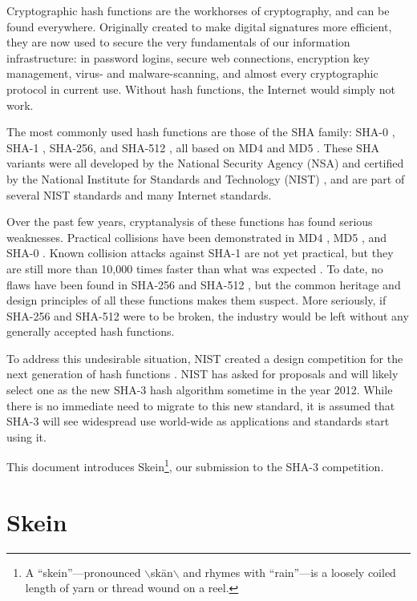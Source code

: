 \documentclass[11pt,twoside]{article}
\begin{document}
Cryptographic hash functions are the workhorses of cryptography, and can be found everywhere. Originally created to make digital signatures more efficient, they are now used to secure the very fundamentals of our information infrastructure: in password logins, secure web connections, encryption key management, virus- and malware-scanning, and almost every cryptographic protocol in current use.  Without hash functions, the Internet would simply not work.

The most commonly used hash functions are those of the SHA family: SHA-0 \cite{SHA}, SHA-1 \cite{SHA-1}, SHA-256, and SHA-512 \cite{SHA-2}, all based on MD4 \cite{MD4} and MD5 \cite{MD5}.  These SHA variants were all developed by the National Security Agency (NSA) and certified by the National Institute for Standards and Technology (NIST) \cite{SHA,SHA-1,SHA-2}, and are part of several NIST standards \cite{DSS,HMAC2,ECC,RNG} and many Internet standards.

Over the past few years, cryptanalysis of these functions has found serious weaknesses.  Practical collisions have been demonstrated in MD4 \cite{D98,WFLY04,KBPL05,WLFCY05}, MD5 \cite{WFLY04,WY05,KBPL05,K05a,K05b,K06,S06}, and SHA-0 \cite{CJ98,WFLY04,WYY05}.  Known collision attacks against SHA-1 are not yet practical, but they are still more than 10,000 times faster than what was expected \cite{WYY05}.  To date, no flaws have been found in SHA-256 and SHA-512 \cite{HPR04}, but the common heritage and design principles of all these functions makes them suspect. More seriously, if SHA-256 and SHA-512 were to be broken, the industry would be left without any generally accepted hash functions.

To address this undesirable situation, NIST created a design competition for the next generation of hash functions \cite{SHA-3a}.  NIST has asked for proposals \cite{SHA-3b} and will likely select one as the new SHA-3 hash algorithm sometime in the year 2012.  While there is no immediate need to migrate to this new standard, it is assumed that SHA-3 will see widespread use world-wide as applications and standards start using it.

This document introduces Skein\footnote{A ``skein''---pronounced $\backslash$sk\={a}n$\backslash$ and rhymes with ``rain''---is a loosely coiled length of yarn or thread wound on a reel.}, our submission to the SHA-3 competition.

\section{Skein}
\end{document}
